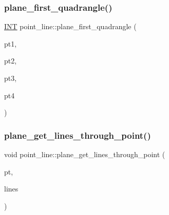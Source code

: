 \mbox{\label{classpoint__line_a55b03935dbca4629616563978c88ba2c}} 
\subsubsection{\texorpdfstring{plane\+\_\+first\+\_\+quadrangle()}{plane\_first\_quadrangle()}}
{\footnotesize\ttfamily \mbox{\hyperlink{galois_8h_a09fddde158a3a20bd2dcadb609de11dc}{I\+NT}} point\+\_\+line\+::plane\+\_\+first\+\_\+quadrangle (\begin{DoxyParamCaption}\item[{\mbox{\hyperlink{galois_8h_a09fddde158a3a20bd2dcadb609de11dc}{I\+NT}} \&}]{pt1,  }\item[{\mbox{\hyperlink{galois_8h_a09fddde158a3a20bd2dcadb609de11dc}{I\+NT}} \&}]{pt2,  }\item[{\mbox{\hyperlink{galois_8h_a09fddde158a3a20bd2dcadb609de11dc}{I\+NT}} \&}]{pt3,  }\item[{\mbox{\hyperlink{galois_8h_a09fddde158a3a20bd2dcadb609de11dc}{I\+NT}} \&}]{pt4 }\end{DoxyParamCaption})}

\mbox{\label{classpoint__line_a658e08635a1479f58edc3f275ea9d28e}} 
\subsubsection{\texorpdfstring{plane\+\_\+get\+\_\+lines\+\_\+through\+\_\+point()}{plane\_get\_lines\_through\_point()}}
{\footnotesize\ttfamily void point\+\_\+line\+::plane\+\_\+get\+\_\+lines\+\_\+through\+\_\+point (\begin{DoxyParamCaption}\item[{\mbox{\hyperlink{galois_8h_a09fddde158a3a20bd2dcadb609de11dc}{I\+NT}}}]{pt,  }\item[{\mbox{\hyperlink{galois_8h_a09fddde158a3a20bd2dcadb609de11dc}{I\+NT}} $\ast$}]{lines }\end{DoxyParamCaption})}

